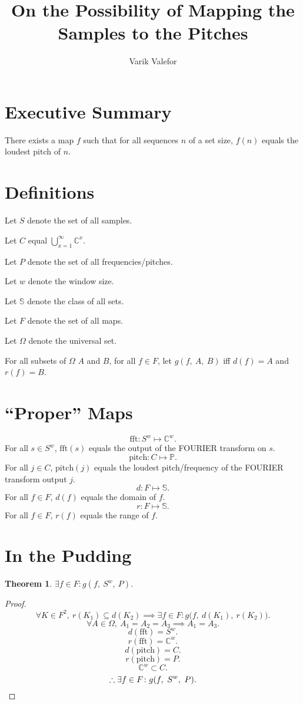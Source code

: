 \documentclass{article}
\title{On the Possibility of Mapping the Samples to the Pitches}
\author{Varik Valefor}
\newtheorem{thm}{Theorem}
\begin{document}
	\maketitle
	\section{Executive Summary}
		There exists a map $f$ such that for all sequences $n$ of a set size, $f(n)$ equals the loudest pitch of $n$.
	\section{Definitions}
		Let $S$ denote the set of all samples.

		Let $C$ equal $\bigcup_{x=1}^\infty \mathbb C^x$.

		Let $P$ denote the set of all frequencies/pitches.

		Let $w$ denote the window size.

		Let $\mathbb S$ denote the class of all sets.

		Let $F$ denote the set of all maps.

		Let $\Omega$ denote the universal set.

		For all subsets of $\Omega$ $A$ and $B$, for all $f \in F$, let $g(f,\ A,\ B)$ iff $d(f) = A$ and $r(f) = B$.
	\section{``Proper'' Maps}
		\[
			\mathrm{fft} \colon S^w \mapsto \mathbb C^w.
		\]
		For all $s \in S^w$, $\mathrm{fft}(s)$ equals the output of the FOURIER transform on $s$.
		\[
			\mathrm{pitch} \colon C \mapsto \mathbb P.
		\]
		For all $j \in C$, $\mathrm{pitch}(j)$ equals the loudest pitch/frequency of the FOURIER transform output $j$.
		\[
			d : F \mapsto \mathbb S.
		\]
		For all $f \in F$, $d(f)$ equals the domain of $f$.
		\[
			r : F \mapsto \mathbb S.
		\]
		For all $f \in F$, $r(f)$ equals the range of $f$.
	\section{In the Pudding}
		\begin{thm}
			$\exists f \in F \colon g(f,\ S^w,\ P)$.
		\end{thm}
		\begin{proof}
			\[
				\forall K \in F^2,\ 
				r(K_1) \subseteq d(K_2) \implies
				\exists f \in F \colon g\big(f,\ d(K_1),\ r(K_2)\big).
			\]
			\[
				\forall A \in \Omega,\ 
				A_1 = A_2 = A_3 \implies
				A_1 = A_3.
			\]
			\[
				d(\mathrm{fft}) = S^w.
			\]
			\[
				r(\mathrm{fft}) = \mathbb C^w.
			\]
			\[
				d(\mathrm{pitch}) = C.
			\]
			\[
				r(\mathrm{pitch}) = P.
			\]
			\[
				\mathbb C^w \subset C.
			\]
			\[
				\therefore \exists f \in F \colon g(f,\ S^w,\ P).\qedhere
			\]
		\end{proof}
\end{document}

